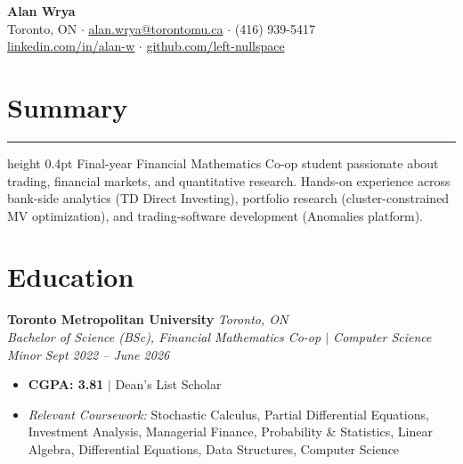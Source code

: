 \documentclass[11pt,letterpaper]{article}
\newcommand{\role}[4]{%
  \needspace{4\baselineskip}%
  \noindent\textbf{#1} \hfill \textit{#2} \\
  \textit{#3} \hfill \textit{#4} \\[-4pt]
}
\begin{document}
\begin{center}
  {\LARGE\bfseries Alan Wrya} \\[4pt]
  {\small Toronto, ON $\cdot$ \href{mailto:alan.wrya@torontomu.ca}{alan.wrya@torontomu.ca} $\cdot$ (416) 939-5417} \\
  {\small \href{https://www.linkedin.com/in/alan-w-499547298/}{linkedin.com/in/alan-w} $\cdot$ \href{https://github.com/left-nullspace}{github.com/left-nullspace}}
\end{center}

\section*{Summary}
\hrule height 0.4pt \vspace{2pt}
\noindent Final-year Financial Mathematics Co-op student passionate about trading, financial markets, and quantitative research. Hands-on experience across bank-side analytics (TD Direct Investing), portfolio research (cluster-constrained MV optimization), and trading-software development (Anomalies platform).

\section*{Education}
\role{Toronto Metropolitan University}{Toronto, ON}{Bachelor of Science (BSc), Financial Mathematics Co-op $|$ Computer Science Minor}{Sept 2022 -- June 2026}
\begin{itemize}
  \item \textbf{CGPA: 3.81} $|$ Dean's List Scholar
  \item \textit{Relevant Coursework:} Stochastic Calculus, Partial Differential Equations, Investment Analysis, Managerial Finance, Probability \& Statistics, Linear Algebra, Differential Equations, Data Structures, Computer Science
\end{itemize}
\end{document}
